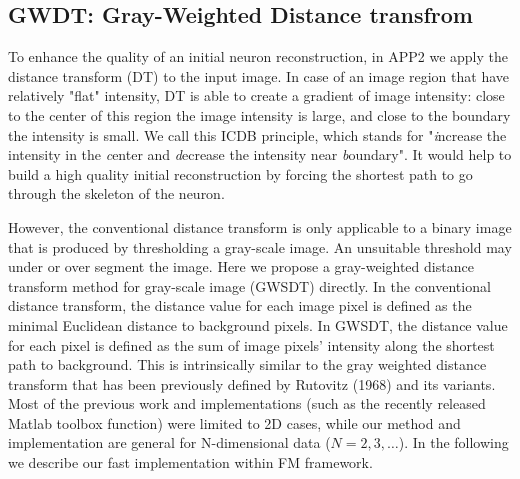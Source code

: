 \subsection{GWDT: Gray-Weighted Distance transfrom} \label{sec:gwdt}
To enhance the quality of an initial neuron reconstruction, in APP2 we apply the distance transform (DT) to the input image. In case of an image region that have relatively "flat" intensity, DT is able to create a gradient of image intensity: close to the center of this region the image intensity is large, and close to the boundary the intensity is small. We call this ICDB principle, which stands for "\emph{i}ncrease the intensity in the \emph{c}enter and \emph{d}ecrease the intensity near \emph{b}oundary". It would help to build a high quality initial reconstruction by forcing the shortest path to go through the skeleton of the neuron.

However, the conventional distance transform is only applicable to a binary image that is produced by thresholding a gray-scale image. An unsuitable threshold may under or over segment the image. Here we propose a gray-weighted distance transform method for gray-scale image (GWSDT) directly. In the conventional distance transform, the distance value for each image pixel is defined as the minimal Euclidean distance to background pixels. In GWSDT, the distance value for each pixel is defined as the sum of image pixels’ intensity along the shortest path to background. This is intrinsically similar to the gray weighted distance transform that has been previously defined by Rutovitz (1968)\cite{rutovitz1968data} and its variants. Most of the previous work and implementations (such as the recently released Matlab toolbox function) were limited to 2D cases, while our method and implementation are general for N-dimensional data ($N = 2,3,\ldots$). In the following we describe our fast implementation within FM framework.   

